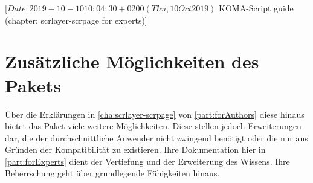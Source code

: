 %
%
%
%
%
%
%
%
% 
%
%
%
%

%
                 [$Date: 2019-10-10 10:04:30 +0200 (Thu, 10 Oct 2019) $
                  KOMA-Script guide (chapter: scrlayer-scrpage for experts)]

\chapter[{Zusätzliche Möglichkeiten von \Package{scrlayer-scrpage}}]
{Zusätzliche Möglichkeiten des
  Pakets
  }
%
\BeginIndexGroup
{}%
Über die Erklärungen in \autoref{cha:scrlayer-scrpage} von
\autoref{part:forAuthors} diese hinaus bietet
das Paket  viele weitere Möglichkeiten. Diese
stellen jedoch Erweiterungen dar, die der durchschnittliche Anwender
nicht zwingend benötigt oder die nur aus Gründen der Kompatibilität zu
 existieren. Ihre Dokumentation hier in
\autoref{part:forExperts} dient der Vertiefung und der Erweiterung des
Wissens. Ihre Beherrschung geht über grundlegende Fähigkeiten hinaus.

